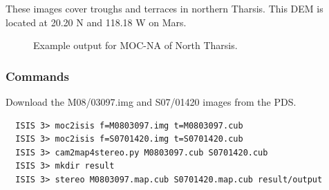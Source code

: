 These images cover troughs and terraces in northern Tharsis.
This \ac{DEM} is located at 20.20 N and 118.18 W on Mars.

\begin{figure}[h!]
\centering
  \hfil
\caption{Example output for MOC-NA of North Tharsis.}
\label{fig:mocna_n_tharsis_example}
\end{figure}

\subsubsection*{Commands}

Download the M08/03097.img and S07/01420 images from the \ac{PDS}.
\begin{verbatim}
  ISIS 3> moc2isis f=M0803097.img t=M0803097.cub
  ISIS 3> moc2isis f=S0701420.img t=S0701420.cub
  ISIS 3> cam2map4stereo.py M0803097.cub S0701420.cub
  ISIS 3> mkdir result
  ISIS 3> stereo M0803097.map.cub S0701420.map.cub result/output
\end{verbatim}

